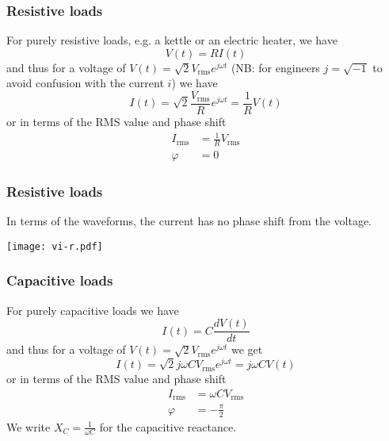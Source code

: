 \documentclass[10pt,aspectratio=169,dvipsnames]{beamer}
\begin{document}
\begin{frame}
  \frametitle{Resistive loads}

  For purely \alert{resistive loads}, e.g. a kettle or an electric heater, we have
  \begin{equation*}
    V(t) = R I(t)
  \end{equation*}
  and thus for a voltage of $V(t) = \sqrt{2} V_{\textrm{rms}}
  e^{j\omega t}$ (NB: for engineers $j = \sqrt{-1}$ to avoid confusion
  with the current $i$) we have
  \begin{equation*}
    I(t) = \sqrt{2} \frac{V_{\textrm{rms}}}{R} e^{j\omega t} = \frac{1}{R} V(t)
  \end{equation*}
  or in terms of the RMS value and phase shift
  \begin{align*}
    I_{\textrm{rms}} & = \frac{1}{R} V_{\textrm{rms}} \\
    \varphi & = 0
  \end{align*}


\end{frame}


\begin{frame}
  \frametitle{Resistive loads}

  In terms of the waveforms, the current has no phase shift from the voltage.

  \centering
  \texttt{[image: vi-r.pdf]}

\end{frame}



\begin{frame}
  \frametitle{Capacitive loads}

  For purely \alert{capacitive loads} we have
  \begin{equation*}
       I(t) = C  \frac{dV(t)}{dt}
  \end{equation*}
  and thus for a voltage of $V(t) = \sqrt{2} V_{\textrm{rms}}
  e^{j\omega t}$ we get
  \begin{equation*}
    I(t) = \sqrt{2} j\omega C V_{\textrm{rms}} e^{j\omega t} = j\omega C V(t)
  \end{equation*}
  or in terms of the RMS value and phase shift
  \begin{align*}
    I_{\textrm{rms}} & = \omega C V_{\textrm{rms}} \\
    \varphi & = -\frac{\pi}{2}
  \end{align*}
  We write $X_{C} = \frac{1}{\omega C}$ for the \alert{capacitive reactance}.


\end{frame}
\end{document}
